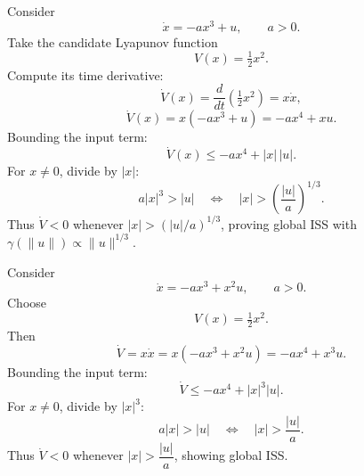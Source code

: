 \begin{example}
Consider 
\begin{equation}
    \dot{x} = -a x^3 + u, \qquad a>0.
\end{equation}
Take the candidate Lyapunov function
\begin{equation}
    V(x) = \tfrac{1}{2}x^2.
\end{equation}
Compute its time derivative:
\begin{equation}
    \dot V(x) = \frac{d}{dt}\!\left(\tfrac{1}{2}x^2\right) = x\dot x,
\end{equation}
\begin{equation}
    \dot V(x) = x(-a x^3 + u) = -a x^4 + x u.
\end{equation}
Bounding the input term:
\begin{equation}
    \dot V(x) \le -a x^4 + |x|\,|u|.
\end{equation}
For $x\neq 0$, divide by $|x|$:
\begin{equation}
    a|x|^3 > |u| \quad \Longleftrightarrow \quad |x| > \left(\frac{|u|}{a}\right)^{1/3}.
\end{equation}
Thus $\dot V<0$ whenever $|x|>(|u|/a)^{1/3}$, proving global ISS with 
\(\gamma(\|u\|)\propto \|u\|^{1/3}\).
\end{example}

\begin{example}
Consider
\begin{equation}
    \dot{x} = -a x^3 + x^2 u, \qquad a>0.
\end{equation}
Choose
\begin{equation}
    V(x)=\tfrac{1}{2}x^2.
\end{equation}
Then
\begin{equation}
    \dot V = x\dot x = x(-a x^3 + x^2 u) = -a x^4 + x^3 u.
\end{equation}
Bounding the input term:
\begin{equation}
    \dot V \le -a x^4 + |x|^3 |u|.
\end{equation}
For $x\neq 0$, divide by $|x|^3$:
\begin{equation}
    a|x| > |u| \quad \Longleftrightarrow \quad |x| > \frac{|u|}{a}.
\end{equation}
Thus $\dot V<0$ whenever $|x| > \dfrac{|u|}{a}$, showing global ISS.
\end{example}

